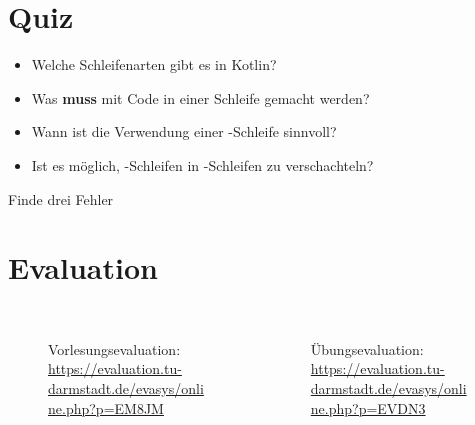 \section{Quiz}
\begin{frame}
    \slidehead
    \pause
    \begin{itemize}
        \item Welche Schleifenarten gibt es in Kotlin?\pause
        \item Was \textbf{muss} mit Code in einer Schleife gemacht werden?\pause
        \item Wann ist die Verwendung einer -Schleife sinnvoll?\pause
        \item Ist es möglich, -Schleifen in -Schleifen zu verschachteln?\pause
    \end{itemize}
    \begin{block}{Finde drei Fehler}
    \end{block}
\end{frame}

\section{Evaluation}
\begin{frame}
    \slidehead
    \begin{columns}
        \begin{column}{7cm}
            \vspace{-0.5cm}
            \begin{figure}
                \centering
                \\  \sffamily \tiny Vorlesungsevaluation: \\
                \url{https://evaluation.tu-darmstadt.de/evasys/online.php?p=EM8JM}
            \end{figure}
        \end{column}
        \begin{column}{7cm}
            \vspace{-0.5cm}
            \begin{figure}
                \centering
                \\  \sffamily \tiny Übungsevaluation: \\
                \url{https://evaluation.tu-darmstadt.de/evasys/online.php?p=EVDN3}
            \end{figure}
        \end{column}
    \end{columns}
\end{frame}




